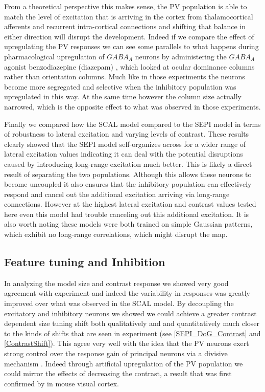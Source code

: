 From a theoretical perspective this makes sense, the PV population is
able to match the level of excitation that is arriving in the cortex
from thalamocortical afferents and recurrent intra-cortical
connections and shifting that balance in either direction will disrupt
the development. Indeed if we compare the effect of upregulating the
PV responses we can see some parallels to what happens during
pharmacological upregulation of $GABA_A$ neurons by administering the
$GABA_A$ agonist benzodiazepine (diazepam)
\citep{Fagiolini2004,Hensch2004}, which looked at ocular dominance
columns rather than orientation columns. Much like in those
experiments the neurons become more segregated and selective when the
inhibitory population was upregulated in this way. At the same time
however the column size actually narrowed, which is the opposite
effect to what was observed in those experiments.

Finally we compared how the SCAL model compared to the SEPI model in
terms of robustness to lateral excitation and varying levels of
contrast. These results clearly showed that the SEPI model
self-organizes across for a wider range of lateral excitation values
indicating it can deal with the potential disruptions caused by
introducing long-range excitation much better. This is likely a direct
result of separating the two populations. Although this allows these
neurons to become uncoupled it also ensures that the inhibitory
population can effectively respond and cancel out the additional
excitation arriving via long-range connections. However at the highest
lateral excitation and contrast values tested here even this model had
trouble canceling out this additional excitation. It is also worth
noting these models were both trained on simple Gaussian patterns,
which exhibit no long-range correlations, which might disrupt the map.

\subsection{Feature tuning and Inhibition}

In analyzing the model size and contrast response we showed very good
agreement with experiment and indeed the variability in responses was
greatly improved over what was observed in the SCAL model. By
decoupling the excitatory and inhibitory neurons we showed we could
achieve a greater contrast dependent size tuning shift both
qualitatively and and quantitatively much closer to the kinds of
shifts that are seen in experiment (see \ref{SEPI_DoG_Contrast} and
\ref{ContrastShift}). This agree very well with the idea that the PV
neurons exert strong control over the response gain of principal
neurons via a divisive mechanism \citep{Wilson2012}. Indeed through
artificial upregulation of the PV population we could mirror the
effects of decreasing the contrast, a result that was first confirmed
by \cite{Nienborg2013} in mouse visual cortex.

